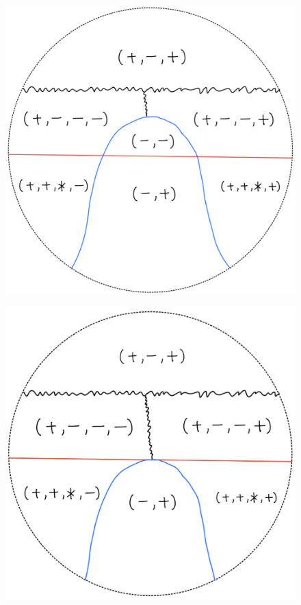 \begin{definition}
\begin{enumerate}
\begin{itemize}
\begin{figure}[H]
    \caption{}
    \label{fig:your-label}
\end{figure}
\begin{figure}[H]
    \centering
    \includegraphics[scale = 0.45]{diagrams/lemma2/9.png} 
    \caption{}
    \label{fig:your-label}
\end{figure}
\begin{figure}[H]
    \centering
    \includegraphics[scale = 0.45]{diagrams/lemma2/10.png} 

\end{figure}
\end{itemize}
\end{enumerate}
\end{definition}
